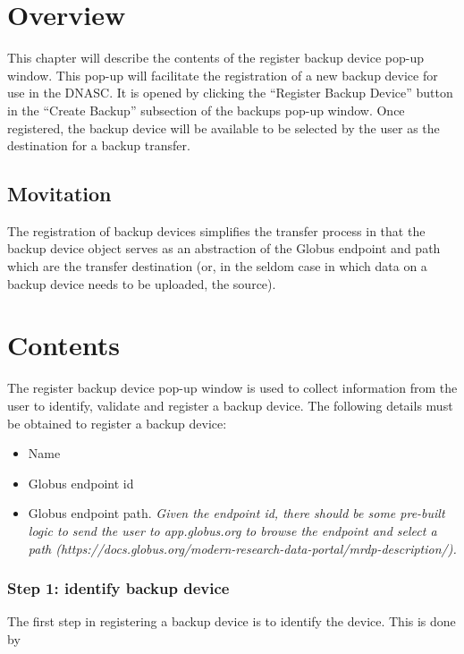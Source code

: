 
\section{Overview}

This chapter will describe the contents of the register backup device pop-up 
window. This pop-up will facilitate the registration of a new backup device
for use in the DNASC. It is opened by clicking the ``Register Backup Device''
button in the ``Create Backup'' subsection of the backups pop-up window.
Once registered, the backup device will be available to be selected by the
user as the destination for a backup transfer.

\subsection{Movitation}
The registration of backup devices simplifies the transfer process in that the 
backup device object serves as an abstraction of the Globus endpoint and path 
which are the transfer destination (or, in the seldom case in which data on 
a backup device needs to be uploaded, the source).

\section{Contents}

The register backup device pop-up window is used to collect information from
the user to identify, validate and register a backup device. The following details 
must be obtained to register a backup device:
\begin{itemize}\itemsep1pt
    \item Name
    \item Globus endpoint id
    \item Globus endpoint path. \emph{Given the endpoint id, there should be some pre-built logic to send the user to
app.globus.org to browse the endpoint and select a path (https://docs.globus.org/modern-research-data-portal/mrdp-description/).}
\end{itemize}

\subsubsection{Step 1: identify backup device}

The first step in registering a backup device is to identify the device. This is 
done by

